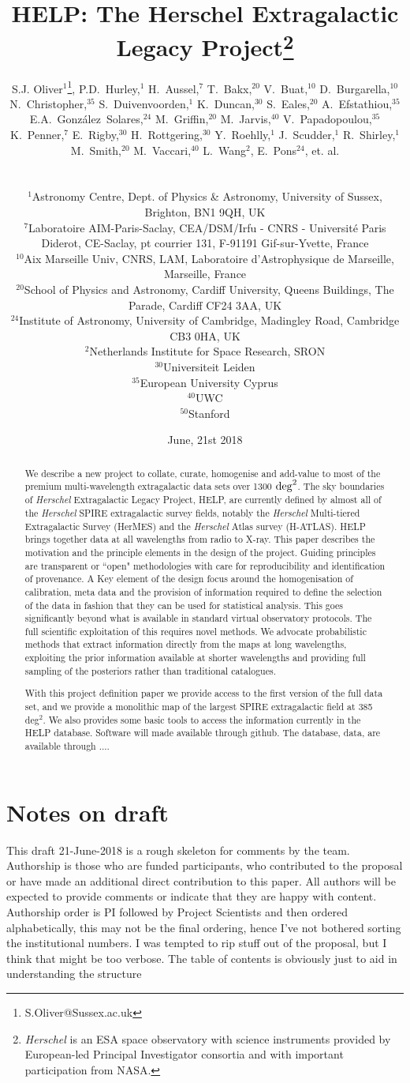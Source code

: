 \documentclass[usenatbib]{mnras}
\title[HELP: The Herschel Extragalactic Legacy Project]{HELP: The Herschel
  Extragalactic Legacy Project\footnote{{\em Herschel} is an ESA space
  observatory with science instruments provided by European-led Principal
Investigator consortia and with important participation from NASA.}}
\date{June, 21st 2018}
\author[S. J. Oliver et al.]
{
  \parbox{\textwidth}
  {\raggedright S.J. Oliver$^{1}$\thanks{S.Oliver@Sussex.ac.uk},
  P.D.~Hurley,$^{1}$
  H.~Aussel,$^{7}$
  T.~Bakx,$^{20}$
  V.~Buat,$^{10}$
  D.~Burgarella,$^{10}$
  N.~Christopher,$^{35}$
  S.~Duivenvoorden,$^{1}$
  K.~Duncan,$^{30}$
  S.~Eales,$^{20}$
  A.~Efstathiou,$^{35}$
  E.A.~Gonz\'alez~Solares,$^{24}$
  M.~Griffin,$^{20}$
  M.~Jarvis,$^{40}$
  V.~Papadopoulou,$^{35}$
  K.~Penner,$^{7}$
  E.~Rigby,$^{30}$
  H.~Rottgering,$^{30}$
  Y.~Roehlly,$^{1}$
  J.~Scudder,$^{1}$
  R.~Shirley,$^{1}$
  M.~Smith,$^{20}$
  M.~Vaccari,$^{40}$
  L.~Wang$^{2}$,
  E.~Pons$^{24}$,
  et. al.
}
\vspace{0.4cm}\\
\parbox{\textwidth}
{\raggedright
  $^{1}$Astronomy Centre, Dept. of Physics \& Astronomy, University of Sussex,
  Brighton, BN1 9QH, UK\\
  $^{7}$Laboratoire AIM-Paris-Saclay, CEA/DSM/Irfu - CNRS - Universit\'e Paris
  Diderot, CE-Saclay, pt courrier 131, F-91191 Gif-sur-Yvette, France\\
  $^{10}$Aix Marseille Univ, CNRS, LAM, Laboratoire d'Astrophysique de Marseille, 
Marseille, France\\
  $^{20}$School of Physics and Astronomy, Cardiff University, Queens Buildings,
  The Parade, Cardiff CF24 3AA, UK\\
  $^{24}$Institute of Astronomy, University of Cambridge, Madingley Road,
  Cambridge CB3 0HA, UK\\
  $^{2}$Netherlands Institute for Space Research, SRON\\
  $^{30}$Universiteit Leiden\\
  $^{35}$European University Cyprus\\
  $^{40}$UWC\\
  $^{50}$Stanford\\
}}
\newcommand{\Herschel}{\textit{Herschel} }
\begin{document}
\maketitle


\section*{Notes on draft}

{\color{red} This draft 21-June-2018 is a rough skeleton for comments by the
team.  Authorship is those who are funded participants, who contributed to the
proposal or have made an additional direct contribution to this paper. All
authors will be expected to provide comments or indicate that they are happy
with content. Authorship order is PI followed by Project Scientists and then
ordered  alphabetically, this may not be the final ordering, hence I've not
bothered sorting the institutional numbers. I was tempted to rip stuff out of
the proposal, but I think that might be too verbose. The table of contents is
obviously just to aid in understanding the structure}

\tableofcontents


\begin{abstract}
  We describe a new project to collate, curate, homogenise and add-value to most 
  of the premium multi-wavelength extragalactic data sets over 1300 ${\rm
  deg}^2$. The sky boundaries of \Herschel Extragalactic Legacy Project, HELP,  are currently defined by almost all of the \Herschel SPIRE extragalactic survey fields,
  notably the \Herschel Multi-tiered Extragalactic Survey (HerMES) and the
  \Herschel Atlas survey (H-ATLAS). HELP brings together data at all wavelengths
  from radio to X-ray.  This paper describes the motivation and the principle
  elements in the design of the project. Guiding principles are transparent or ``open" methodologies with care for reproducibility and identification of provenance. A Key element of the design focus
  around the homogenisation of calibration, meta data and the provision of
  information required to define the selection of the data in fashion that 
  they can be used for statistical analysis. This goes significantly beyond what is available in standard virtual observatory protocols. The full
  scientific exploitation of this requires novel methods.  We  advocate
  probabilistic methods that extract information directly from the maps at long
  wavelengths, exploiting the prior information available at shorter wavelengths
  and providing full sampling of the posteriors rather than traditional
  catalogues. 


  With this project definition paper we provide access to the first version of the full data set, and we provide a monolithic map of the largest SPIRE extragalactic
  field at 385 deg$^2$. We also provides some basic tools to access the
  information currently in the HELP database.   Software will made available
  through github.  The database, data, are available through ....
\end{abstract}
\end{document}
